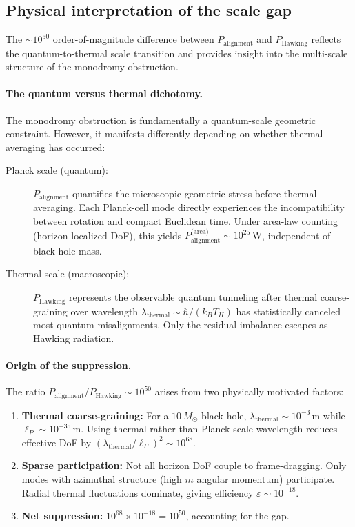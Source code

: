 \documentclass[11pt]{article}
\begin{document}
\subsection*{Physical interpretation of the scale gap}

The $\sim 10^{50}$ order-of-magnitude difference between $P_{\text{alignment}}$ and 
$P_{\text{Hawking}}$ reflects the quantum-to-thermal scale transition and provides 
insight into the multi-scale structure of the monodromy obstruction.

\paragraph{The quantum versus thermal dichotomy.}
The monodromy obstruction is fundamentally a quantum-scale geometric constraint. 
However, it manifests differently depending on whether thermal averaging has occurred:

\begin{description}
  \item[Planck scale (quantum):] $P_{\text{alignment}}$ quantifies the microscopic 
  geometric stress before thermal averaging. Each Planck-cell mode directly experiences 
  the incompatibility between rotation and compact Euclidean time. Under area-law 
  counting (horizon-localized DoF), this yields $P_{\text{alignment}}^{\text{(area)}} 
  \sim 10^{25}\,\text{W}$, independent of black hole mass.
  
  \item[Thermal scale (macroscopic):] $P_{\text{Hawking}}$ represents the observable 
  quantum tunneling after thermal coarse-graining over wavelength 
  $\lambda_{\text{thermal}} \sim \hbar/(k_B T_H)$ has statistically canceled most 
  quantum misalignments. Only the residual imbalance escapes as Hawking radiation.
\end{description}

\paragraph{Origin of the suppression.}
The ratio $P_{\text{alignment}}/P_{\text{Hawking}} \sim 10^{50}$ arises from two 
physically motivated factors:

\begin{enumerate}[label=(\roman*)]
  \item \textbf{Thermal coarse-graining:} 
  For a $10\,M_\odot$ black hole, $\lambda_{\text{thermal}} \sim 10^{-3}\,\text{m}$ 
  while $\ell_P \sim 10^{-35}\,\text{m}$. Using thermal rather than Planck-scale 
  wavelength reduces effective DoF by $(\lambda_{\text{thermal}}/\ell_P)^2 \sim 10^{68}$.
  
  \item \textbf{Sparse participation:} 
  Not all horizon DoF couple to frame-dragging. Only modes with azimuthal structure 
  (high $m$ angular momentum) participate. Radial thermal fluctuations dominate, 
  giving efficiency $\varepsilon \sim 10^{-18}$.
  
  \item \textbf{Net suppression:} 
  $10^{68} \times 10^{-18} = 10^{50}$, accounting for the gap.
\end{enumerate}
\end{document}
